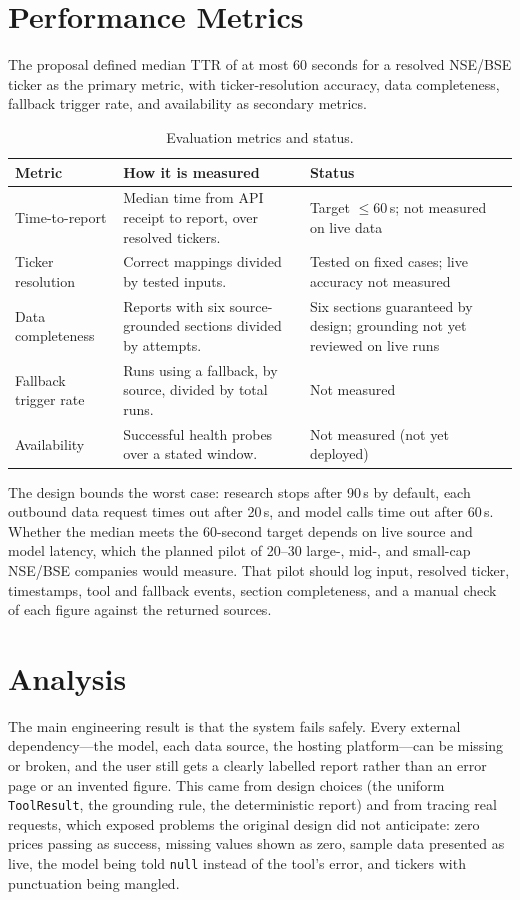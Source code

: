 \documentclass[12pt,a4paper,oneside]{report}
\begin{document}
\section{Performance Metrics}
The proposal defined median TTR of at most 60 seconds for a resolved NSE/BSE ticker as the primary metric, with ticker-resolution accuracy, data completeness, fallback trigger rate, and availability as secondary metrics.
\begin{table}[H]\centering\small
\begin{tabularx}{\textwidth}{>{\raggedright\arraybackslash}p{3cm}X>{\raggedright\arraybackslash}p{3.6cm}}
\toprule \textbf{Metric} & \textbf{How it is measured} & \textbf{Status}\\\midrule
Time-to-report & Median time from API receipt to report, over resolved tickers. & Target $\leq 60$\,s; not measured on live data\\
Ticker resolution & Correct mappings divided by tested inputs. & Tested on fixed cases; live accuracy not measured\\
Data completeness & Reports with six source-grounded sections divided by attempts. & Six sections guaranteed by design; grounding not yet reviewed on live runs\\
Fallback trigger rate & Runs using a fallback, by source, divided by total runs. & Not measured\\
Availability & Successful health probes over a stated window. & Not measured (not yet deployed)\\
\bottomrule
\end{tabularx}
\caption{Evaluation metrics and status.}
\label{tab:metrics}
\end{table}
The design bounds the worst case: research stops after 90\,s by default, each outbound data request times out after 20\,s, and model calls time out after 60\,s. Whether the median meets the 60-second target depends on live source and model latency, which the planned pilot of 20--30 large-, mid-, and small-cap NSE/BSE companies would measure. That pilot should log input, resolved ticker, timestamps, tool and fallback events, section completeness, and a manual check of each figure against the returned sources.

\section{Analysis}
The main engineering result is that the system fails safely. Every external dependency---the model, each data source, the hosting platform---can be missing or broken, and the user still gets a clearly labelled report rather than an error page or an invented figure. This came from design choices (the uniform \texttt{ToolResult}, the grounding rule, the deterministic report) and from tracing real requests, which exposed problems the original design did not anticipate: zero prices passing as success, missing values shown as zero, sample data presented as live, the model being told \texttt{null} instead of the tool's error, and tickers with punctuation being mangled.
\end{document}
